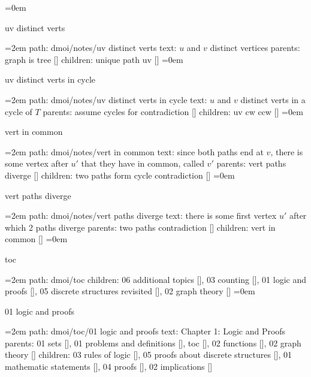 \smallskip
\leftskip=0em
\par\endgroup
\bigskip
{}
uv distinct verts
\smallskip
\par\begingroup
\leftskip=2em
path: dmoi/notes/uv distinct verts
\smallskip
text:  $u$ and $v$ distinct vertices
\smallskip
parents:  graph is tree []
\smallskip
children: unique path uv []
\smallskip
\leftskip=0em
\par\endgroup
\bigskip
{}
uv distinct verts in cycle
\smallskip
\par\begingroup
\leftskip=2em
path: dmoi/notes/uv distinct verts in cycle
\smallskip
text:  $u$ and $v$ distinct verts in a cycle of $T$
\smallskip
parents:  assume cycles for contradiction []
\smallskip
children: uv cw ccw []
\smallskip
\leftskip=0em
\par\endgroup
\bigskip
{}
vert in common
\smallskip
\par\begingroup
\leftskip=2em
path: dmoi/notes/vert in common
\smallskip
text:  since both paths end at $v$, there is some vertex after $u'$ that they have in common, called $v'$
\smallskip
parents:  vert paths diverge []
\smallskip
children: two paths form cycle contradiction []
\smallskip
\leftskip=0em
\par\endgroup
\bigskip
{}
vert paths diverge
\smallskip
\par\begingroup
\leftskip=2em
path: dmoi/notes/vert paths diverge
\smallskip
text:  there is some first vertex $u'$ after which 2 paths diverge
\smallskip
parents:  two paths contradiction []
\smallskip
children: vert in common []
\smallskip
\leftskip=0em
\par\endgroup
\bigskip
{}
toc
\smallskip
\par\begingroup
\leftskip=2em
path: dmoi/toc
\smallskip
children: 06 additional topics [], 03 counting [], 01 logic and proofs [], 05 discrete structures revisited [], 02 graph theory []
\smallskip
\leftskip=0em
\par\endgroup
\bigskip
{}
01 logic and proofs
\smallskip
\par\begingroup
\leftskip=2em
path: dmoi/toc/01 logic and proofs
\smallskip
text:  Chapter 1: Logic and Proofs
\smallskip
parents:  01 sets [], 01 problems and definitions [], toc [], 02 functions [], 02 graph theory []
\smallskip
children: 03 rules of logic [], 05 proofs about discrete structures [], 01 mathematic statements [], 04 proofs [], 02 implications []
